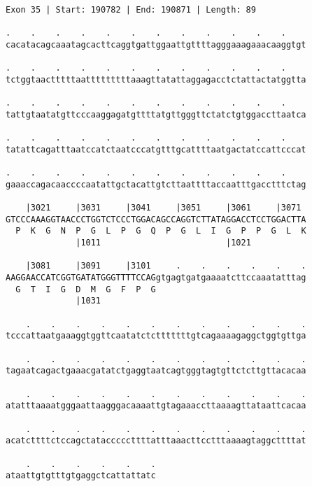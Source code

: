 \documentclass{article}
\begin{document}
\begin{Verbatim}
Exon 35 | Start: 190782 | End: 190871 | Length: 89
 
.    .    .    .    .    .    .    .    .    .    .    .    
cacatacagcaaatagcacttcaggtgattggaattgttttagggaaagaaacaaggtgt
  
.    .    .    .    .    .    .    .    .    .    .    .    
tctggtaactttttaatttttttttaaagttatattaggagacctctattactatggtta
  
.    .    .    .    .    .    .    .    .    .    .    .    
tattgtaatatgttcccaaggagatgttttatgttgggttctatctgtggaccttaatca
  
.    .    .    .    .    .    .    .    .    .    .    .    
tatattcagatttaatccatctaatcccatgtttgcattttaatgactatccattcccat
  
.    .    .    .    .    .    .    .    .    .    .    .    
gaaaccagacaaccccaatattgctacattgtcttaattttaccaatttgacctttctag
  
    |3021     |3031     |3041     |3051     |3061     |3071 
GTCCCAAAGGTAACCCTGGTCTCCCTGGACAGCCAGGTCTTATAGGACCTCCTGGACTTA
  P  K  G  N  P  G  L  P  G  Q  P  G  L  I  G  P  P  G  L  K
              |1011                         |1021           
  
    |3081     |3091     |3101     .    .    .    .    .    .
AAGGAACCATCGGTGATATGGGTTTTCCAGgtgagtgatgaaaatcttccaaatatttag
  G  T  I  G  D  M  G  F  P  G                              
              |1031                                         
  
    .    .    .    .    .    .    .    .    .    .    .    .
tcccattaatgaaaggtggttcaatatctctttttttgtcagaaaagaggctggtgttga
  
    .    .    .    .    .    .    .    .    .    .    .    .
tagaatcagactgaaacgatatctgaggtaatcagtgggtagtgttctcttgttacacaa
  
    .    .    .    .    .    .    .    .    .    .    .    .
atatttaaaatgggaattaagggacaaaattgtagaaaccttaaaagttataattcacaa
  
    .    .    .    .    .    .    .    .    .    .    .    .
acatcttttctccagctatacccccttttatttaaacttcctttaaaagtaggcttttat
  
    .    .    .    .    .    .
ataattgtgtttgtgaggctcattattatc
\end{Verbatim}
\newpage
\end{document}
